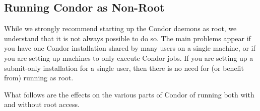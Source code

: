 
\subsection{\label{sec:Non-Root}Running Condor as Non-Root}

While we strongly recommend starting up the Condor daemons as root, we
understand that it is not always possible to do so.
The main problems appear
if you have one Condor installation shared by many users
on a single machine, or if you are setting up machines to only
execute Condor jobs.
If you are setting up a submit-only installation for
a single user, then there is no need for (or benefit from) running as
root.  

What follows are the effects on the various parts of Condor
of running both with and without root access.

